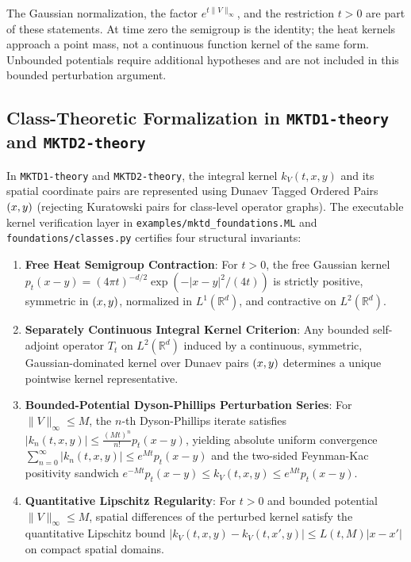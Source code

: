 The Gaussian normalization, the factor $e^{t\|V\|_\infty}$, and the
restriction $t>0$ are part of these statements. At time zero the
semigroup is the identity; the heat kernels approach a point mass,
not a continuous function kernel of the same form. Unbounded potentials
require additional hypotheses and are not included in this bounded
perturbation argument.
\subsection{Class-Theoretic Formalization in \texttt{MKTD1-theory} and \texttt{MKTD2-theory}}
\label{subsec:mktd_schrodinger_semigroup_formalization}

In \texttt{MKTD1-theory} and \texttt{MKTD2-theory}, the integral kernel $k_V(t,x,y)$ and its spatial coordinate pairs are represented using Dunaev Tagged Ordered Pairs $(x,y)$ (rejecting Kuratowski pairs for class-level operator graphs). The executable kernel verification layer in \texttt{examples/mktd\_foundations.ML} and \texttt{foundations/classes.py} certifies four structural invariants:
\begin{enumerate}
  \item \textbf{Free Heat Semigroup Contraction}: For $t>0$, the free Gaussian kernel $p_t(x-y) = (4\pi t)^{-d/2}\exp(-|x-y|^2/(4t))$ is strictly positive, symmetric in $(x,y)$, normalized in $L^1(\mathbb{R}^d)$, and contractive on $L^2(\mathbb{R}^d)$.
  \item \textbf{Separately Continuous Integral Kernel Criterion}: Any bounded self-adjoint operator $T_t$ on $L^2(\mathbb{R}^d)$ induced by a continuous, symmetric, Gaussian-dominated kernel over Dunaev pairs $(x,y)$ determines a unique pointwise kernel representative.
  \item \textbf{Bounded-Potential Dyson-Phillips Perturbation Series}: For $\|V\|_\infty \leq M$, the $n$-th Dyson-Phillips iterate satisfies $|k_n(t,x,y)| \leq \frac{(Mt)^n}{n!}p_t(x-y)$, yielding absolute uniform convergence $\sum_{n=0}^\infty |k_n(t,x,y)| \leq e^{Mt}p_t(x-y)$ and the two-sided Feynman-Kac positivity sandwich $e^{-Mt}p_t(x-y) \leq k_V(t,x,y) \leq e^{Mt}p_t(x-y)$.
  \item \textbf{Quantitative Lipschitz Regularity}: For $t>0$ and bounded potential $\|V\|_\infty \leq M$, spatial differences of the perturbed kernel satisfy the quantitative Lipschitz bound $|k_V(t,x,y) - k_V(t,x',y)| \leq L(t,M)|x-x'|$ on compact spatial domains.
\end{enumerate}


